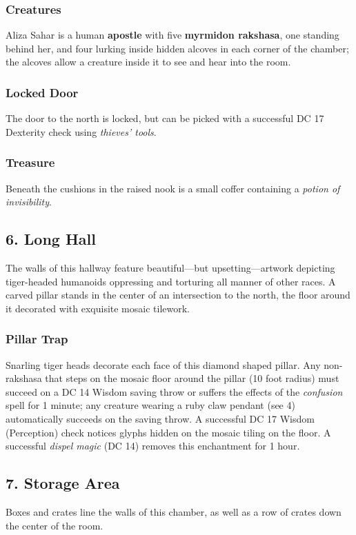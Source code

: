 \documentclass[10pt,a4paper,twoside,bg=print,twocolumn,openany,nodeprecatedcode]{dndbook}
\begin{document}
\subsubsection{Creatures}
Aliza Sahar is a human \textbf{apostle} with five \textbf{myrmidon rakshasa}, one standing behind her, and four lurking inside hidden alcoves in each corner of the chamber; the alcoves allow a creature inside it to see and hear into the room.

\subsubsection{Locked Door}
The door to the north is locked, but can be picked with a successful DC 17 Dexterity check using \textit{thieves' tools}.

\subsubsection{Treasure}
Beneath the cushions in the raised nook is a small coffer containing a \textit{potion of invisibility}.

\subsection{6. Long Hall}
\begin{DndReadAloud}{}
The walls of this hallway feature beautiful—but upsetting—artwork depicting tiger-headed humanoids oppressing and torturing all manner of other races. A carved pillar stands in the center of an intersection to the north, the floor around it decorated with exquisite mosaic tilework.

\end{DndReadAloud}

\subsubsection{Pillar Trap}
Snarling tiger heads decorate each face of this diamond shaped pillar. Any non-rakshasa that steps on the mosaic floor around the pillar (10 foot radius) must succeed on a DC 14 Wisdom saving throw or suffers the effects of the \textit{confusion} spell for 1 minute; any creature wearing a ruby claw pendant (see 4) automatically succeeds on the saving throw. A successful DC 17 Wisdom (Perception) check notices glyphs hidden on the mosaic tiling on the floor. A successful \textit{dispel magic} (DC 14) removes this enchantment for 1 hour.

\subsection{7. Storage Area}
\begin{DndReadAloud}{}
Boxes and crates line the walls of this chamber, as well as a row of crates down the center of the room.

\end{DndReadAloud}
\end{document}
